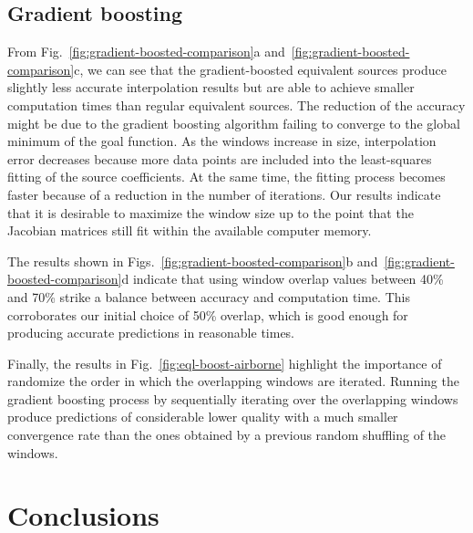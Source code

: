 \subsection{Gradient boosting}

From Fig.~\ref{fig:gradient-boosted-comparison}a
and~\ref{fig:gradient-boosted-comparison}c, we can see that the
gradient-boosted equivalent sources produce slightly less accurate
interpolation results but are able to achieve smaller computation times than
regular equivalent sources.
The reduction of the accuracy might be due to the gradient boosting algorithm
failing to converge to the global minimum of the goal function.
As the windows increase in size, interpolation error decreases because more data
points are included into the least-squares fitting of the source coefficients.
At the same time, the fitting process becomes faster because of a reduction in
the number of iterations.
Our results indicate that it is desirable to maximize the window size up to the
point that the Jacobian matrices still fit within the available computer
memory.

The results shown in Figs.~\ref{fig:gradient-boosted-comparison}b
and~\ref{fig:gradient-boosted-comparison}d indicate that using
window overlap values between 40\% and 70\% strike a balance between
accuracy and computation time.
This corroborates our initial choice of 50\% overlap, which is good enough for
producing accurate predictions in reasonable times.

Finally, the results in Fig.~\ref{fig:eql-boost-airborne} highlight the
importance of randomize the order in which the overlapping windows are
iterated.
Running the gradient boosting process by sequentially iterating over the
overlapping windows produce predictions of considerable lower quality with
a much smaller convergence rate than the ones obtained by a previous random
shuffling of the windows.


\section{Conclusions}

